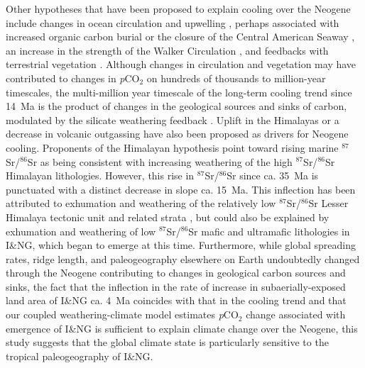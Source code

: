 \documentclass[11pt,letterpaper]{article}
\newcommand{\SrSr}{$^{87}$Sr/$^{86}$Sr\xspace}
\newcommand{\pCOtwo}{\textit{p}CO$_{2}$\xspace}
\begin{document}
Other hypotheses that have been proposed to explain cooling over the Neogene include changes in ocean circulation and upwelling \citep{Shevenell2004a, Holbourn2015a}, perhaps associated with increased organic carbon burial \citep{Vincent1985a, Flower1993a} or the closure of the Central American Seaway \citep{Haug1998a}, an increase in the strength of the Walker Circulation \citep{Molnar2015a}, and feedbacks with terrestrial vegetation \citep{Cerling1997a}. Although changes in circulation and vegetation may have contributed to changes in \pCOtwo on hundreds of thousands to million-year timescales, the multi-million year timescale of the long-term cooling trend since 14~Ma is the product of changes in the geological sources and sinks of carbon, modulated by the silicate weathering feedback \citep{Walker1981a, Raymo1991a, Berner1997a, Kump1997a, Berner2001a}. Uplift in the Himalayas \citep{Raymo1988a} or a decrease in volcanic outgassing \citep{Berner1983a, Rowan2016a} have also been proposed as drivers for Neogene cooling. Proponents of the Himalayan hypothesis point toward rising marine \SrSr as being consistent with increasing weathering of the high \SrSr Himalayan lithologies. However, this rise in \SrSr since ca. 35~Ma is punctuated with a distinct decrease in slope ca. 15~Ma. This inflection has been attributed to exhumation and weathering of the relatively low \SrSr Lesser Himalaya tectonic unit and related strata \citep{Myrow2015a, Colleps2018a}, but could also be explained by exhumation and weathering of low \SrSr mafic and ultramafic lithologies in I\&NG, which began to emerge at this time. Furthermore, while global spreading rates, ridge length, and paleogeography elsewhere on Earth undoubtedly changed through the Neogene contributing to changes in geological carbon sources and sinks, the fact that the inflection in the rate of increase in subaerially-exposed land area of I\&NG ca. 4~Ma coincides with that in the cooling trend and that our coupled weathering-climate model estimates \pCOtwo change associated with emergence of I\&NG is sufficient to explain climate change over the Neogene, this study suggests that the global climate state is particularly sensitive to the tropical paleogeography of I\&NG.



\end{document}
